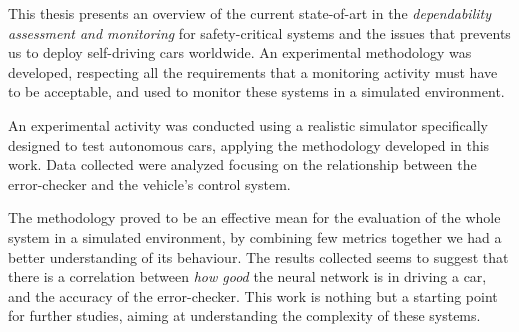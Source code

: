 \documentclass{article}
\begin{document}
This thesis presents an overview of the current state-of-art in the \textsl{dependability assessment and monitoring} for safety-critical systems and the issues that prevents us to deploy self-driving cars worldwide. An experimental methodology was developed, respecting all the requirements that a monitoring activity must have to be acceptable, and used to monitor these systems in a simulated environment.

An experimental activity was conducted using a realistic simulator specifically designed to test autonomous cars, applying the methodology developed in this work. Data collected were analyzed focusing on the relationship between the error-checker and the vehicle's control system.

The methodology proved to be an effective mean for the evaluation of the whole system in a simulated environment, by combining few metrics together we had a better understanding of its behaviour. The results collected seems to suggest that there is a correlation between \textsl{how good} the neural network is in driving a car, and the accuracy of the error-checker.
This work is nothing but a starting point for further studies, aiming at understanding the complexity of these systems.
\end{document}
